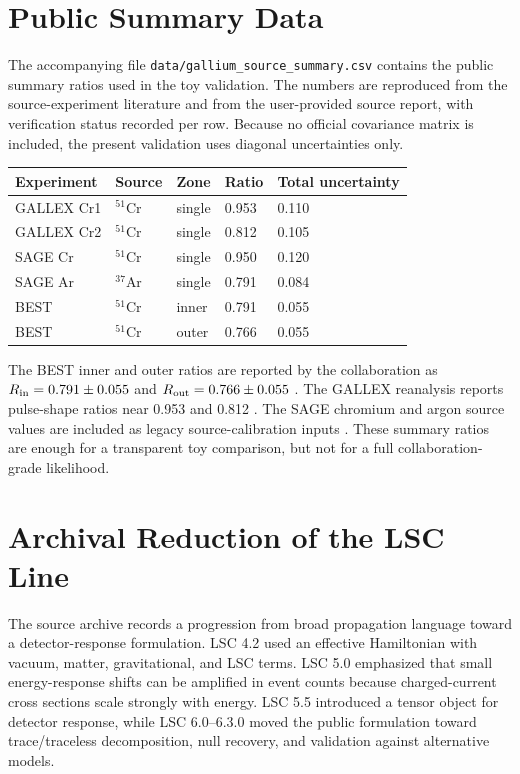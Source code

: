\documentclass[11pt]{article}
\begin{document}
\section{Public Summary Data}

The accompanying file \texttt{data/gallium\_source\_summary.csv} contains the
public summary ratios used in the toy validation.  The numbers are reproduced
from the source-experiment literature and from the user-provided source report,
with verification status recorded per row.  Because no official covariance
matrix is included, the present validation uses diagonal uncertainties only.

\begin{center}
\begin{tabular}{lllll}
\toprule
Experiment & Source & Zone & Ratio & Total uncertainty \\
\midrule
GALLEX Cr1 & $^{51}$Cr & single & 0.953 & 0.110 \\
GALLEX Cr2 & $^{51}$Cr & single & 0.812 & 0.105 \\
SAGE Cr & $^{51}$Cr & single & 0.950 & 0.120 \\
SAGE Ar & $^{37}$Ar & single & 0.791 & 0.084 \\
BEST & $^{51}$Cr & inner & 0.791 & 0.055 \\
BEST & $^{51}$Cr & outer & 0.766 & 0.055 \\
\bottomrule
\end{tabular}
\end{center}

The BEST inner and outer ratios are reported by the collaboration as
$R_{\rm in}=0.791\pm0.055$ and $R_{\rm out}=0.766\pm0.055$ \cite{best2022}.
The GALLEX reanalysis reports pulse-shape ratios near 0.953 and 0.812
\cite{kaether2010}.  The SAGE chromium and argon source values are included as
legacy source-calibration inputs \cite{sagecr1999,sagear2006}.  These summary
ratios are enough for a transparent toy comparison, but not for a full
collaboration-grade likelihood.

\section{Archival Reduction of the LSC Line}

The source archive records a progression from broad propagation language toward
a detector-response formulation.  LSC 4.2 used an effective Hamiltonian with
vacuum, matter, gravitational, and LSC terms.  LSC 5.0 emphasized that small
energy-response shifts can be amplified in event counts because charged-current
cross sections scale strongly with energy.  LSC 5.5 introduced a tensor object
for detector response, while LSC 6.0--6.3.0 moved the public formulation toward
trace/traceless decomposition, null recovery, and validation against alternative
models.
\end{document}
